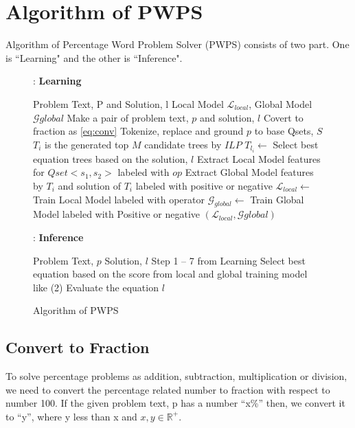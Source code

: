 \documentclass[document.tex]{subfiles}
\begin{document}
\section{Algorithm of PWPS}
Algorithm of Percentage Word Problem Solver (PWPS) consists of two part. One is ``Learning" and the other is ``Inference".
\begin{figure}[H]
	\begin{algorithm}[H]
		\caption{: \textbf{Learning}}
		\begin{algorithmic}[1]
			\renewcommand{\algorithmicrequire}{\textbf{Input:}}
			\renewcommand{\algorithmicensure}{\textbf{Output:}}
			\REQUIRE Problem Text, P and Solution, l
			\ENSURE  Local Model $\mathcal{L}_{local}$, Global Model $ \mathcal{G}{global}$
			\STATE Make a pair of problem text, $p$ and solution, $l$
			\STATE Covert to fraction as \ref{eq:conv}
			\STATE Tokenize, replace and ground $p$ to base Qsets, $S$
			\STATE $T_{i}$  is the generated top $M$ candidate trees by $ILP$
			\STATE $T_{l_i} \leftarrow$ Select best equation trees based on the solution, $l$
			\STATE Extract Local Model features for $Qset <s_1, s_2>$ labeled with $op$
			\STATE Extract Global Model features by $T_i$  and solution of $T_i$ labeled with positive or negative
			\ENDFOR
			\STATE $\mathcal{L}_{local} \leftarrow$  Train Local Model labeled with operator
			\STATE $\mathcal{G}_{global} \leftarrow$  Train Global Model labeled with Positive or negative
			\RETURN $( \mathcal{L}_{local}, \mathcal{G}{global} )$
		\end{algorithmic}
	\end{algorithm}
	\begin{algorithm}[H]
		\caption{: \textbf{Inference}}
		\begin{algorithmic}[1]
			\renewcommand{\algorithmicrequire}{\textbf{Input:}}
			\renewcommand{\algorithmicensure}{\textbf{Output:}}
			\REQUIRE Problem Text, $p$
			\ENSURE  Solution, $l$
			\STATE Step 1 -- 7 from Learning
			\STATE Select best equation based on the score from local and global training model like (2)
			\STATE Evaluate the equation
			\RETURN $l$
		\end{algorithmic}
	\end{algorithm}
	\caption{Algorithm of PWPS}
	\label{fig:algo}
\end{figure}

\subsection{Convert to Fraction}
\noindent To solve percentage problems as addition, subtraction, multiplication or division, we need to convert the percentage related number to fraction with respect to number 100. If the given problem text, p has a number “x\%” then, we convert it to “y”, where y less than x and $x, y \in \mathbb{R^+}$.
\end{document}
